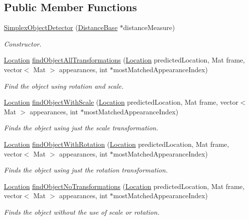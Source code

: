 \subsection*{Public Member Functions}
\begin{DoxyCompactItemize}
\item 
\hyperlink{class_simplex_object_detector_a808e69553c4b8ff683e187416fde7f56}{Simplex\+Object\+Detector} (\hyperlink{class_distance_base}{Distance\+Base} $\ast$distance\+Measure)
\begin{DoxyCompactList}\small\item\em Constructor. \end{DoxyCompactList}\item 
\hyperlink{struct_a_i_s___options_1_1_location}{Location} \hyperlink{class_simplex_object_detector_a6b09b0c1629feffb2523d9ed6038545b}{find\+Object\+All\+Transformations} (\hyperlink{struct_a_i_s___options_1_1_location}{Location} predicted\+Location, Mat frame, vector$<$ Mat $>$ appearances, int $\ast$most\+Matched\+Appearance\+Index)
\begin{DoxyCompactList}\small\item\em Find the object using rotation and scale. \end{DoxyCompactList}\item 
\hyperlink{struct_a_i_s___options_1_1_location}{Location} \hyperlink{class_simplex_object_detector_ac6e9fcfe1427b93308b69f950d6ba88e}{find\+Object\+With\+Scale} (\hyperlink{struct_a_i_s___options_1_1_location}{Location} predicted\+Location, Mat frame, vector$<$ Mat $>$ appearances, int $\ast$most\+Matched\+Appearance\+Index)
\begin{DoxyCompactList}\small\item\em Finds the object using just the scale transformation. \end{DoxyCompactList}\item 
\hyperlink{struct_a_i_s___options_1_1_location}{Location} \hyperlink{class_simplex_object_detector_af245a74403f3b2098042b0e1e567e999}{find\+Object\+With\+Rotation} (\hyperlink{struct_a_i_s___options_1_1_location}{Location} predicted\+Location, Mat frame, vector$<$ Mat $>$ appearances, int $\ast$most\+Matched\+Appearance\+Index)
\begin{DoxyCompactList}\small\item\em Finds the object using just the rotation transformation. \end{DoxyCompactList}\item 
\hyperlink{struct_a_i_s___options_1_1_location}{Location} \hyperlink{class_simplex_object_detector_ae62a15fe369dfd1698358f2cb36e0d63}{find\+Object\+No\+Transformations} (\hyperlink{struct_a_i_s___options_1_1_location}{Location} predicted\+Location, Mat frame, vector$<$ Mat $>$ appearances, int $\ast$most\+Matched\+Appearance\+Index)
\begin{DoxyCompactList}\small\item\em Finds the object without the use of scale or rotation. \end{DoxyCompactList}\end{DoxyCompactItemize}
